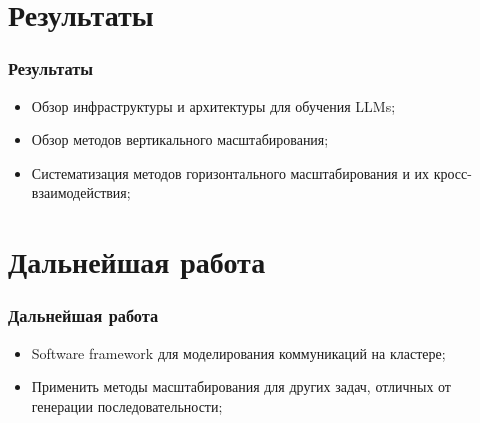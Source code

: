 
\section{Результаты}

\begin{frame}
\frametitle{Результаты}
\begin{itemize}
\item[1)] Обзор инфраструктуры и архитектуры для обучения LLMs;
\item[2)] Обзор методов вертикального масштабирования;
\item[3)] Систематизация методов горизонтального масштабирования и их кросс-взаимодействия;
\end{itemize}
\end{frame}


\section{Дальнейшая работа}

\begin{frame}
\frametitle{Дальнейшая работа}
\begin{itemize}
\item[1)] Software framework для моделирования коммуникаций на кластере;
\item[2)] Применить методы масштабирования для других задач, отличных от генерации последовательности;
\end{itemize}
\end{frame}
